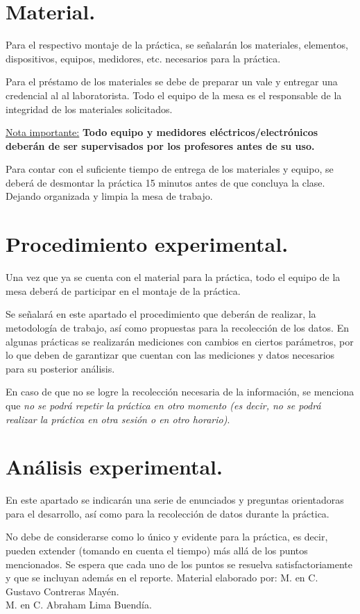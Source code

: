 \section{Material.}
Para el respectivo montaje de la práctica, se señalarán los materiales, elementos, dispositivos, equipos, medidores, etc. necesarios para la práctica.
\par
Para el préstamo de los materiales se debe de preparar un vale  y entregar una credencial al al laboratorista. Todo el equipo de la mesa es el responsable de la integridad de los materiales solicitados.
\par
\underline{Nota importante:} \textbf{Todo equipo y medidores eléctricos/electrónicos deberán de ser supervisados por los profesores antes de su uso.}
\par
Para contar con el suficiente tiempo de entrega de los materiales y equipo, se deberá de desmontar la práctica 15 minutos antes de que concluya la clase. Dejando organizada y limpia la mesa de trabajo.
\section{Procedimiento experimental.}
Una vez que ya se cuenta con el material para la práctica, todo el equipo de la mesa deberá de participar en el montaje de la práctica.
\par
Se señalará en este apartado el procedimiento que deberán de realizar, la metodología de trabajo, así como propuestas para la recolección de los datos. En algunas prácticas se realizarán mediciones con cambios en ciertos parámetros, por lo que deben de garantizar que cuentan con las mediciones y datos necesarios para su posterior análisis.
\par
En caso de que no se logre la recolección necesaria de la información, se menciona que \emph{no se podrá repetir la práctica en otro momento (es decir, no se podrá realizar la práctica en otra sesión o en otro horario)}.
\section{Análisis experimental.}
En este apartado se indicarán una serie de enunciados y preguntas orientadoras para el desarrollo, así como para la recolección de datos durante la práctica.
\par
No debe de considerarse como lo único y evidente para la práctica, es decir, pueden extender (tomando en cuenta el tiempo) más allá de los puntos mencionados. Se espera que cada uno de los puntos se resuelva satisfactoriamente y que se incluyan además en el reporte.
\vfill
\small{Material elaborado por: M. en C. Gustavo Contreras Mayén. \\ \hspace*{4.57cm} M. en C. Abraham Lima Buendía.}
